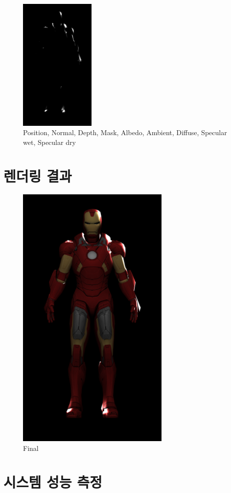 \documentclass[a4paper,itemph,amsmath,oneside,11pt,openany]{xoblivoir}
\begin{document}
\begin{figure}[H]
\includegraphics[width=37mm]{img/specular_dry}

\caption{Position, Normal, Depth, Mask, Albedo, Ambient, Diffuse, Specular wet, Specular dry}
\label{mid}
\end{figure}

\section{렌더링 결과}
\begin{figure}[H]
\centering
\includegraphics[width=75mm]{img/final}

\caption{Final}
\end{figure}

\section{시스템 성능 측정}
\end{document}
